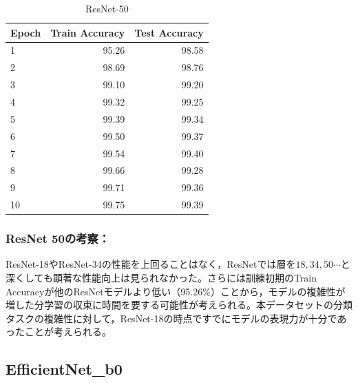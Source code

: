 \documentclass[a4paper,11pt,titlepage]{jsarticle}
\begin{document}
\begin{table}[H]
\centering
\caption{ResNet-50}
\label{tab:ResNet50}
\begin{tabular}{lrr}
\hline
 Epoch &  Train Accuracy &  Test Accuracy \\
\hline
     1 &           95.26 &                98.58 \\
     2 &           98.69 &                98.76 \\
     3 &           99.10 &                99.20 \\
     4 &           99.32 &                99.25 \\
     5 &           99.39 &                99.34 \\
     6 &           99.50 &                99.37 \\
     7 &           99.54 &                99.40 \\
     8 &           99.66 &                99.28 \\
     9 &           99.71 &                99.36 \\
    10 &           99.75 &                99.39 \\
\hline
\end{tabular}
\end{table}

\subsubsection*{ResNet 50の考察：}
ResNet-18やResNet-34の性能を上回ることはなく，ResNetでは層を$18,34,50 \cdots$と深くしても顕著な性能向上は見られなかった。さらには訓練初期のTrain Accuracyが他のResNetモデルより低い（95.26\%）ことから，モデルの複雑性が増した分学習の収束に時間を要する可能性が考えられる。本データセットの分類タスクの複雑性に対して，ResNet-18の時点ですでにモデルの表現力が十分であったことが考えられる。


\subsection{EfficientNet\_b0}
\end{document}
